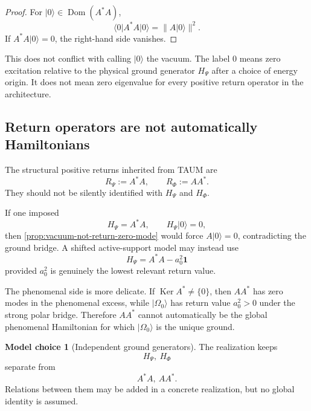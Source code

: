 \documentclass[11pt,reqno]{scrartcl}
\newcommand{\idop}{\mathbf 1}
\newcommand{\ket}[1]{\lvert #1\rangle}
\newcommand{\bra}[1]{\langle #1\rvert}
\DeclareMathOperator{\Dom}{Dom}
\DeclareMathOperator{\Ker}{Ker}
\theoremstyle{plain}
\theoremstyle{definition}
\newtheorem{modelchoice}[modelchoice]{Model choice}
\theoremstyle{remark}
\begin{document}
\begin{proof}
For $\ket0\in\Dom(A^*A)$,
\begin{equation}
  \bra0 A^*A\ket0=\|A\ket0\|^2.
\end{equation}
If $A^*A\ket0=0$, the right-hand side vanishes.
\end{proof}

This does not conflict with calling $\ket0$ the vacuum.  The label $0$ means
zero excitation relative to the physical ground generator $H_{\Psi}$ after a
choice of energy origin.  It does not mean zero eigenvalue for every positive
return operator in the architecture.

\subsection{Return operators are not automatically Hamiltonians}

The structural positive returns inherited from TAUM \cite{TAUM2026} are
\begin{equation}
  R_{\Psi}:=A^*A,
  \qquad
  R_{\Phi}:=AA^*.
  \label{eq:structural-returns}
\end{equation}
They should not be silently identified with $H_{\Psi}$ and $H_{\Phi}$.

If one imposed
\begin{equation}
  H_{\Psi}=A^*A,
  \qquad
  H_{\Psi}\ket0=0,
\end{equation}
then \cref{prop:vacuum-not-return-zero-mode} would force
$A\ket0=0$, contradicting the ground bridge.  A shifted active-support model
may instead use
\begin{equation}
  H_{\Psi}=A^*A-a_0^2\idop
  \label{eq:shifted-physical-return-model}
\end{equation}
provided $a_0^2$ is genuinely the lowest relevant return value.

The phenomenal side is more delicate.  If $\Ker A^*\neq\{0\}$, then
$AA^*$ has zero modes in the phenomenal excess, while
$\ket{\Omega_0}$ has return value $a_0^2>0$ under the strong polar bridge.
Therefore $AA^*$ cannot automatically be the global phenomenal Hamiltonian
for which $\ket{\Omega_0}$ is the unique ground.

\begin{modelchoice}[Independent ground generators]
\label{choice:independent-ground-generators}
The realization keeps
\begin{equation}
  H_{\Psi},\ H_{\Phi}
\end{equation}
separate from
\begin{equation}
  A^*A,\ AA^*.
\end{equation}
Relations between them may be added in a concrete realization, but no global
identity is assumed.
\end{modelchoice}
\end{document}
